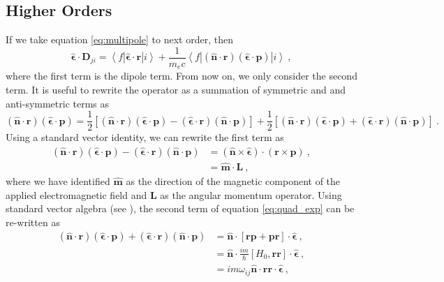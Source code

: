 \documentclass{article}
\begin{document}
\subsection{Higher Orders} \label{sec:HO}
If we take equation \ref{eq:multipole} to next order, then 
\begin{equation}
    \boldsymbol{\hat{\epsilon}}\cdot\mathbf{D}_{ji} = \left\langle f \left| \boldsymbol{\hat{\epsilon}}\cdot\mathbf{r} \right| i \right\rangle + \frac{1}{m_e c} \left\langle f \left| (\boldsymbol{\hat{n}}\cdot\mathbf{r}) ( \boldsymbol{\hat{\epsilon}}\cdot\mathbf{p}) \right| i \right\rangle~,
\end{equation}
where the first term is the dipole term. From now on, we only consider the second term. It is useful to rewrite the operator as a summation of symmetric and and anti-symmetric terms as
\begin{equation}\label{eq:quad_exp}
    (\boldsymbol{\hat{n}}\cdot\mathbf{r}) ( \boldsymbol{\hat{\epsilon}}\cdot\mathbf{p}) = \frac{1}{2}\left[(\boldsymbol{\hat{n}}\cdot\mathbf{r})(\boldsymbol{\hat{\epsilon}}\cdot\mathbf{p}) - (\boldsymbol{\hat{\epsilon}}\cdot\mathbf{r})(\boldsymbol{\hat{n}}\cdot\mathbf{p})\right] +  \frac{1}{2}\left[(\boldsymbol{\hat{n}}\cdot\mathbf{r})(\boldsymbol{\hat{\epsilon}}\cdot\mathbf{p}) + (\boldsymbol{\hat{\epsilon}}\cdot\mathbf{r})(\boldsymbol{\hat{n}}\cdot\mathbf{p})\right]~.
\end{equation}
Using a standard vector identity, we can rewrite the first term as 
\begin{align}
    (\boldsymbol{\hat{n}}\cdot\mathbf{r})(\boldsymbol{\hat{\epsilon}}\cdot\mathbf{p}) - (\boldsymbol{\hat{\epsilon}}\cdot\mathbf{r})(\boldsymbol{\hat{n}}\cdot\mathbf{p}) &= (\boldsymbol{\hat{n}} \times \boldsymbol{\hat{\epsilon}}) \cdot (\mathbf{r} \times \mathbf{p})~, \\
    &= \boldsymbol{\hat{m}}\cdot \mathbf{L}~,
\end{align}
where we have identified $\boldsymbol{\hat{m}}$ as the direction of the magnetic component of the applied electromagnetic field and $\mathbf{L}$ as the angular momentum operator. Using standard vector algebra (see \cite{Bernadotte2012}), the second term of equation \ref{eq:quad_exp} can be re-written as
\begin{align}
    (\boldsymbol{\hat{n}}\cdot\mathbf{r})(\boldsymbol{\hat{\epsilon}}\cdot\mathbf{p}) + (\boldsymbol{\hat{\epsilon}}\cdot\mathbf{r})(\boldsymbol{\hat{n}}\cdot\mathbf{p}) &= \boldsymbol{\hat{n}}\cdot \left[\mathbf{r}\mathbf{p} + \mathbf{p}\mathbf{r}\right]\cdot \boldsymbol{\hat{\epsilon}}~, \\
    &= \boldsymbol{\hat{n}}\cdot \frac{im}{\hbar}\left[H_0, \mathbf{rr}\right]\cdot \boldsymbol{\hat{\epsilon}}~, \\
    &= im\omega_{ij}\boldsymbol{\hat{n}}\cdot\mathbf{rr}\cdot \boldsymbol{\hat{\epsilon}}~,
\end{align}
\end{document}

